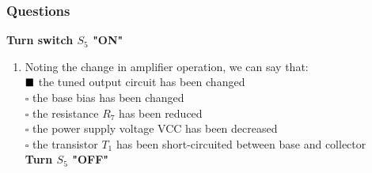 \documentclass[12pt,a4paper]{report}
\begin{document}
\subsubsection{Questions}
\textbf{Turn switch $S_5$ "ON"}
\begin{enumerate}
    \item Noting the change in amplifier operation, we can say that:\\
        \(\textcolor{black}{\blacksquare}\) the tuned output circuit has been changed\\
        \(\square\) the base bias has been changed\\
        \(\square\) the resistance $R_7$ has been reduced\\
        \(\square\) the power supply voltage VCC has been decreased\\
        \(\square\) the transistor $T_1$ has been short-circuited between base and collector\\
        
\textbf{Turn $S_5$ "OFF"}
\end{enumerate}
\end{document}
